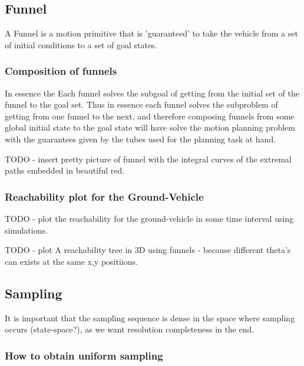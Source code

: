 \subsection{Funnel}

A Funnel is a motion primitive that is 'guaranteed' to take the vehicle from a
set of initial conditions to a set of goal states. 

\subsubsection{Composition of funnels}

In essence the 
Each funnel solves the subgoal of getting from the initial set of the funnel to
the goal set. Thus in essence each funnel solves the subproblem of getting from
one funnel to the next, and therefore composing funnels from some global initial
state to the goal state will have solve the motion planning problem with the
guarantees given by the tubes used for the planning task at hand.

TODO - insert pretty picture of funnel with the integral curves of the extremal
paths embedded in beautiful red.

\subsubsection{Reachability plot for the Ground-Vehicle}
TODO - plot the reachability for the ground-vehicle in some time interval using
simulations. 

TODO - plot A reachability tree in 3D using funnels - because different theta's
can exists at the same x,y positiions.

\subsection{Sampling}
It is important that the sampling sequence is dense in the space where sampling
occurs (state-space?), as we want resolution completeness in the end.
\subsubsection{How to obtain uniform sampling}
